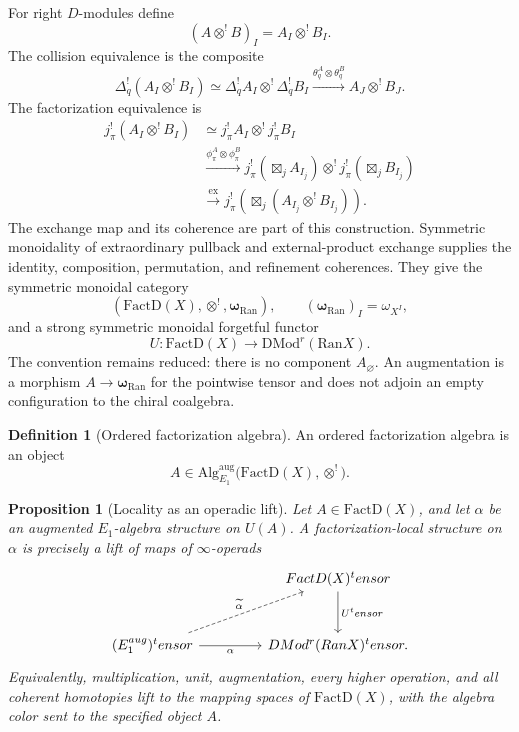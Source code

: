 \documentclass[11pt,reqno]{amsart}
\newtheorem{proposition}[theorem]{Proposition}
\theoremstyle{definition}
\newtheorem{definition}[theorem]{Definition}
\theoremstyle{remark}
\providecommand{\Ran}{\mathrm{Ran}}
\providecommand{\FactD}{\mathrm{FactD}}
\providecommand{\DMod}{\mathrm{DMod}}
\providecommand{\Alg}{\mathrm{Alg}}
\begin{document}
For right \(D\)-modules define
\[
 (A\otimes^!B)_I=A_I\otimes^!B_I.
\]
The collision equivalence is the composite
\[
 \Delta_q^!(A_I\otimes^!B_I)
 \simeq
 \Delta_q^!A_I\otimes^!\Delta_q^!B_I
 \xrightarrow{\theta_q^A\otimes\theta_q^B}
 A_J\otimes^!B_J.
\]
The factorization equivalence is
\[
\begin{aligned}
 j_\pi^!(A_I\otimes^!B_I)
 &\simeq j_\pi^!A_I\otimes^!j_\pi^!B_I\\
 &\xrightarrow{\phi_\pi^A\otimes\phi_\pi^B}
 j_\pi^!\!\left(\boxtimes_jA_{I_j}\right)
 \otimes^!
 j_\pi^!\!\left(\boxtimes_jB_{I_j}\right)\\
 &\xrightarrow{\mathrm{ex}}
 j_\pi^!\!\left(
   \boxtimes_j(A_{I_j}\otimes^!B_{I_j})\right).
\end{aligned}
\]
The exchange map and its coherence are part of this construction.
Symmetric monoidality of extraordinary pullback and external-product
exchange supplies the identity, composition, permutation, and
refinement coherences.  They give the symmetric monoidal category
\[
 (\FactD(X),\otimes^!,\boldsymbol\omega_{\Ran}),
 \qquad
 (\boldsymbol\omega_{\Ran})_I=\omega_{X^I},
\]
and a strong symmetric monoidal forgetful functor
\[
 U:\FactD(X)\longrightarrow\DMod^r(\Ran X).
\]
The convention remains reduced: there is no component
\(A_\varnothing\).  An augmentation is a morphism
\(A\to\boldsymbol\omega_{\Ran}\) for the pointwise tensor and does not
adjoin an empty configuration to the chiral coalgebra.

\begin{definition}[Ordered factorization algebra]
\label{def:ordered-factorization}
An ordered factorization algebra is an object
\[
 A\in
 \Alg^{\mathrm{aug}}_{E_1}\bigl(\FactD(X),\otimes^!\bigr).
\]
\end{definition}

\begin{proposition}[Locality as an operadic lift]
\label{prop:locality-lift}
Let \(A\in\FactD(X)\), and let \(\alpha\) be an augmented
\(E_1\)-algebra structure on \(U(A)\).  A factorization-local structure
on \(\alpha\) is precisely a lift of maps of \(\infty\)-operads
\[
\begin{tikzcd}[column sep=4.5em,row sep=3em]
 & \FactD(X)^\otimes
     \arrow[d,"U^\otimes"]\\
 (E_1^{\mathrm{aug}})^\otimes
     \arrow[r,"\alpha"']
     \arrow[ur,dashed,"\widetilde\alpha"]
 & \DMod^r(\Ran X)^\otimes .
\end{tikzcd}
\]
Equivalently, multiplication, unit, augmentation, every higher
operation, and all coherent homotopies lift to the mapping spaces of
\(\FactD(X)\), with the algebra color sent to the specified object
\(A\).
\end{proposition}
\end{document}
